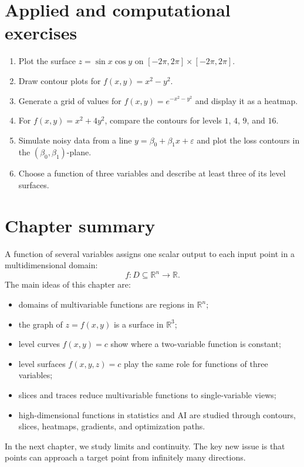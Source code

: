 \documentclass[11pt]{article}
\newcommand{\R}{\mathbb R}
\begin{document}
\section{Applied and computational exercises}

\begin{enumerate}
  \item Plot the surface $z=\sin x\cos y$ on $[-2\pi,2\pi]\times[-2\pi,2\pi]$.
  \item Draw contour plots for $f(x,y)=x^2-y^2$.
  \item Generate a grid of values for $f(x,y)=e^{-x^2-y^2}$ and display it as a heatmap.
  \item For $f(x,y)=x^2+4y^2$, compare the contours for levels $1$, $4$, $9$, and $16$.
  \item Simulate noisy data from a line $y=\beta_0+\beta_1x+\varepsilon$ and plot the loss contours in the $(\beta_0,\beta_1)$-plane.
  \item Choose a function of three variables and describe at least three of its level surfaces.
\end{enumerate}

\section{Chapter summary}

A function of several variables assigns one scalar output to each input point in a multidimensional domain:
\[
f:D\subseteq\R^n\to\R.
\]
The main ideas of this chapter are:
\begin{itemize}
  \item domains of multivariable functions are regions in $\R^n$;
  \item the graph of $z=f(x,y)$ is a surface in $\R^3$;
  \item level curves $f(x,y)=c$ show where a two-variable function is constant;
  \item level surfaces $f(x,y,z)=c$ play the same role for functions of three variables;
  \item slices and traces reduce multivariable functions to single-variable views;
  \item high-dimensional functions in statistics and AI are studied through contours, slices, heatmaps, gradients, and optimization paths.
\end{itemize}

In the next chapter, we study limits and continuity. The key new issue is that points can approach a target point from infinitely many directions.
\end{document}
